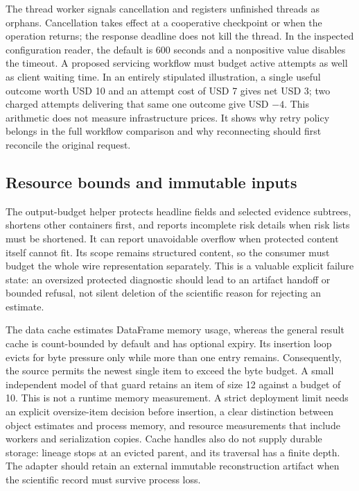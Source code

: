 The thread worker signals cancellation and registers unfinished threads as
orphans. Cancellation takes effect at a cooperative checkpoint or when the
operation returns; the response deadline does not kill the thread. In the
inspected configuration reader, the default is 600 seconds and a nonpositive
value disables the timeout. A proposed servicing workflow must budget active
attempts as well as client waiting time. In an entirely stipulated illustration,
a single useful outcome worth USD 10 and an attempt cost of USD 7 gives net
USD 3; two charged attempts delivering that same one outcome give USD $-4$.
This arithmetic does not measure infrastructure prices. It shows why retry
policy belongs in the full workflow comparison and why reconnecting should
first reconcile the original request.
\citep{exec23_statspai_runtime,exec23_statspai_runtime_reference}

\subsection{Resource bounds and immutable inputs}
\label{exec23:statspai-runtime-custody}
The output-budget helper protects headline fields and selected evidence
subtrees, shortens other containers first, and reports incomplete risk details
when risk lists must be shortened. It can report unavoidable overflow when
protected content itself cannot fit. Its scope remains structured content,
so the consumer must budget the whole wire representation separately. This
is a valuable explicit failure state: an oversized protected diagnostic should
lead to an artifact handoff or bounded refusal, not silent deletion of the
scientific reason for rejecting an estimate.
\citep{exec23_statspai_runtime}

The data cache estimates DataFrame memory usage, whereas the general result
cache is count-bounded by default and has optional expiry. Its insertion loop
evicts for byte pressure only while more than one entry remains. Consequently,
the source permits the newest single item to exceed the byte budget. A small
independent model of that guard retains an item of size 12 against a budget of
10. This is not a runtime memory measurement. A strict deployment limit needs
an explicit oversize-item decision before insertion, a clear distinction
between object estimates and process memory, and resource measurements that
include workers and serialization copies. Cache handles also do not supply
durable storage: lineage stops at an evicted parent, and its traversal has a
finite depth. The adapter should retain an external immutable reconstruction
artifact when the scientific record must survive process loss.
\citep{exec23_statspai_runtime,exec23_statspai_runtime_reference}

